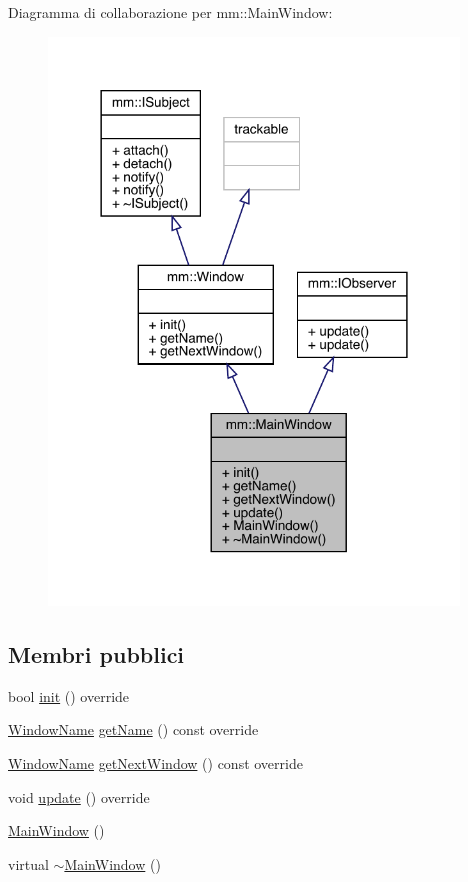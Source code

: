 Diagramma di collaborazione per mm\+:\+:Main\+Window\+:
\nopagebreak
\begin{figure}[H]
\begin{center}
\leavevmode
\includegraphics[width=309pt]{df/d8f/classmm_1_1_main_window__coll__graph}
\end{center}
\end{figure}
\subsection*{Membri pubblici}
\begin{DoxyCompactItemize}
\item 
bool \mbox{\hyperlink{classmm_1_1_main_window_a1094273a8ac991a50e4612efa8174fdd}{init}} () override
\item 
\mbox{\hyperlink{namespacemm_a4e9d92e04f65dbf2fc1963947da0d93c}{Window\+Name}} \mbox{\hyperlink{classmm_1_1_main_window_a8cfdfeb6ad47afff06fa6b1b7fdc0c88}{get\+Name}} () const override
\item 
\mbox{\hyperlink{namespacemm_a4e9d92e04f65dbf2fc1963947da0d93c}{Window\+Name}} \mbox{\hyperlink{classmm_1_1_main_window_aa1511ad7bed8d47cd35415d0a3a1161e}{get\+Next\+Window}} () const override
\item 
void \mbox{\hyperlink{classmm_1_1_main_window_ac0fc4875dc774c1b7b1ca59d174a7fc1}{update}} () override
\item 
\mbox{\hyperlink{classmm_1_1_main_window_ae9a06c62e4efd9fce7334afb032e20d6}{Main\+Window}} ()
\item 
virtual \mbox{\hyperlink{classmm_1_1_main_window_a37132df8fb730f15d8eb75f07e5fd92d}{$\sim$\+Main\+Window}} ()
\end{DoxyCompactItemize}


